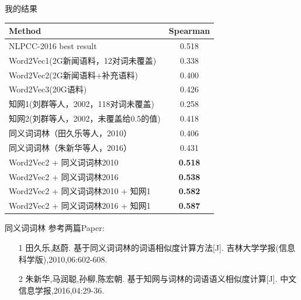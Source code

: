 \documentclass[aspectratio=169]{beamer} %
\begin{document}
    \begin{frame}{我的结果}
          \begin{table}
      \centering
      \label{tab:commands}
      \begin{minipage}{\columnwidth}
      \begin{center}
      \begin{tabular}{lc}
      \hline
       Method                          &  Spearman \\ \hline
       NLPCC-2016 best result  & 0.518 \\ \hline
       Word2Vec1(2G新闻语料，12对词未覆盖) & 0.338 \\ \hline
       Word2Vec2(2G新闻语料+补充语料)      & 0.400 \\ \hline
       Word2Vec3(20G语料)                & 0.426 \\ \hline
       知网1(刘群等人，2002，118对词未覆盖)    & 0.258  \\ \hline
       知网2(刘群等人，2002，未覆盖给0.5的值)  & 0.418  \\ \hline
       同义词词林（田久乐等人，2010）       & 0.406  \\ \hline
       同义词词林（朱新华等人，2016）       & 0.431  \\ \hline
       Word2Vec2 + 同义词词林2010        & \textbf{0.518}  \\ \hline
       Word2Vec2 + 同义词词林2016        & \textbf{0.538}  \\ \hline
       Word2Vec2 + 同义词词林2010 + 知网1 & \textbf{0.582}  \\ \hline
       Word2Vec2 + 同义词词林2016 + 知网1 & \textbf{0.587}  \\ \hline
      \end{tabular}
      \end{center}
      \end{minipage}
      \end{table}
    \end{frame}

    \begin{frame}{同义词词林}
    参考两篇Paper: 
    \begin{itemize}
      \item [1]田久乐,赵蔚. 基于同义词词林的词语相似度计算方法[J]. 吉林大学学报(信息科学版),2010,06:602-608. \\
      \item [2]朱新华,马润聪,孙柳,陈宏朝. 基于知网与词林的词语语义相似度计算[J]. 中文信息学报,2016,04:29-36. \\
    \end{itemize}
    \end{frame}
\end{document}
